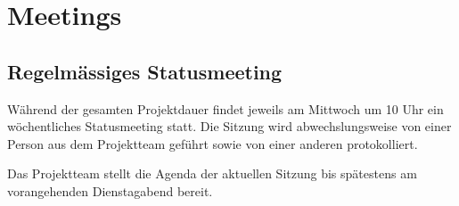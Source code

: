 \section{Meetings}
\subsection{Regelmässiges Statusmeeting}
Während der gesamten Projektdauer findet jeweils am Mittwoch um 10 Uhr ein wöchentliches Statusmeeting statt. Die Sitzung wird abwechslungsweise von einer Person aus dem Projektteam geführt sowie von einer anderen protokolliert.

Das Projektteam stellt die Agenda der aktuellen Sitzung bis spätestens am vorangehenden Dienstagabend bereit.